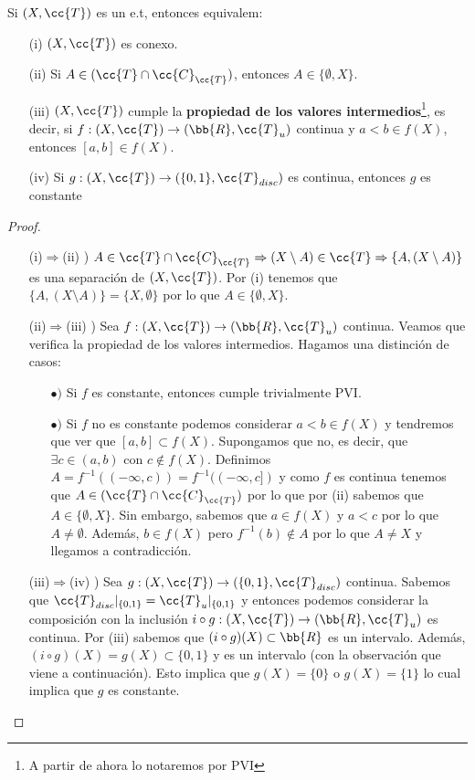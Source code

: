 \begin{teo}
    Si $(X, \cc{T})$ es un e.t, entonces equivalem:
    \begin{enumerate}
        \item[(i)] $(X, \cc{T})$ es conexo.
        \item[(ii)] Si $A\in (\cc{T}\cap \cc{C}_{\cc{T}})$, entonces $A\in\{\emptyset, X\}$.
        \item[(iii)] $(X, \cc{T})$ cumple la \textbf{propiedad de los valores intermedios}\footnote{A partir de ahora lo notaremos por PVI}, es decir, si $f:(X, \cc{T})\to (\bb{R}, \cc{T}_u)$ continua y $a<b\in f(X)$, entonces $[a,b]\in f(X)$.
        \item[(iv)] Si $g:(X, \cc{T})\to (\{0,1\}, \cc{T}_{disc})$ es continua, entonces $g$ es constante 
    \end{enumerate}
    \begin{proof}\
        \begin{itemize}
            \item[(i)$\Rightarrow$(ii) )] $A\in \cc{T}\cap \cc{C}_{\cc{T}} \Rightarrow (X\setminus A) \in \cc{T} \Rightarrow \{A, (X\setminus A)\}$ es una separación de $(X, \cc{T})$. Por (i) tenemos que $\{A, (X\setminus A)\}=\{X, \emptyset\}$ por lo que $A\in \{\emptyset, X\}$.
            \item[(ii)$\Rightarrow$(iii) )] Sea $f:(X, \cc{T})\to (\bb{R}, \cc{T}_u)$ continua. Veamos que verifica la propiedad de los valores intermedios. Hagamos una distinción de casos:
            \begin{itemize}
                \item[$\bullet)$] Si $f$ es constante, entonces cumple trivialmente PVI.
                \item[$\bullet)$] Si $f$ no es constante podemos considerar $a<b\in f(X)$ y tendremos que ver que $[a,b]\subset f(X)$. Supongamos que no, es decir, que $\exists c\in (a,b)$ con $c\notin f(X)$. Definimos $A=f^{-1}((-\infty, c)) = f^{-1}((-\infty, c])$ y como $f$ es continua tenemos que $A\in (\cc{T}\cap \cc{C}_{\cc{T}})$ por lo que por (ii) sabemos que $A\in \{\emptyset, X\}$. Sin embargo, sabemos que $a\in f(X)$ y $a<c$ por lo que $A\neq \emptyset$. Además, $b\in f(X)$ pero $f^{-1}(b)\notin A$ por lo que $A\neq X$ y llegamos a contradicción.
            \end{itemize}
            \item[(iii)$\Rightarrow $(iv) )] Sea $g:(X, \cc{T}) \to (\{0,1\}, \cc{T}_{disc})$ continua. Sabemos que $\cc{T}_{disc}|_{\{0,1\}} = \cc{T}_u|_{\{0,1\}}$ y entonces podemos considerar la composición con la inclusión $i\circ g:(X, \cc{T})\to (\bb{R}, \cc{T}_u)$ es continua. Por (iii) sabemos que $(i\circ g)(X)\subset \bb{R}$ es un intervalo. Además, $(i\circ g)(X) = g(X)\subset \{0,1\}$ y es un intervalo (con la observación que viene a continuación). Esto implica que $g(X)=\{0\}$ o $g(X)=\{1\}$ lo cual implica que $g$ es constante.

\end{itemize}
\end{proof}
\end{teo}
